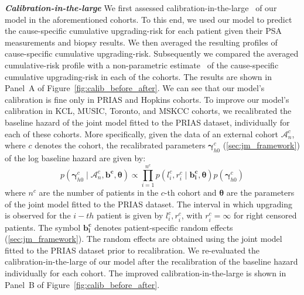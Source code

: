 \textbf{\textit{Calibration-in-the-large}}
We first assessed calibration-in-the-large~\citep{steyerberg2010assessing} of our model in the aforementioned cohorts. To this end, we used our model to predict the cause-specific cumulative upgrading-risk for each patient given their PSA measurements and biopsy results. We then averaged the resulting profiles of cause-specific cumulative upgrading-risk. Subsequently we compared the averaged cumulative-risk profile with a non-parametric estimate~\citep{turnbull1976empirical} of the cause-specific cumulative upgrading-risk in each of the cohorts. The results are shown in Panel~A of Figure~\ref{fig:calib_before_after}. We can see that our model's calibration is fine only in PRIAS and Hopkins cohorts. To improve our model's calibration in KCL, MUSIC, Toronto, and MSKCC cohorts, we recalibrated the baseline hazard of the joint model fitted to the PRIAS dataset, individually for each of these cohorts. More specifically, given the data of an external cohort $\mathcal{A}_n^c$, where $c$ denotes the cohort, the recalibrated parameters $\boldsymbol{\gamma}_{h0}^c$ (\ref{sec:jm_framework}) of the log baseline hazard are given by:
\begin{equation}
p(\boldsymbol{\gamma}_{h0}^c \mid \mathcal{A}_n^c, \boldsymbol{b^c},  \boldsymbol{\theta}) \propto  \prod_{i=1}^{n^c} p(l_i^c, r_i^c \mid \boldsymbol{b^c_i}, \boldsymbol{\theta}) p(\boldsymbol{\gamma}_{h0}^c)
\end{equation}
where $n^c$ are the number of patients in the $c$-th cohort and $\boldsymbol{\theta}$ are the parameters of the joint model fitted to the PRIAS dataset. The interval in which upgrading is observed for the $i-th$ patient is given by $l_i^c, r_i^c$, with $r_i^c = \infty$ for right censored patients. The symbol $\boldsymbol{b^c_i}$ denotes patient-specific random effects (\ref{sec:jm_framework}). The random effects are obtained using the joint model fitted to the PRIAS dataset prior to recalibration. We re-evaluated the calibration-in-the-large of our model after the recalibration of the baseline hazard individually for each cohort. The improved calibration-in-the-large is shown in Panel~B of Figure~\ref{fig:calib_before_after}.

